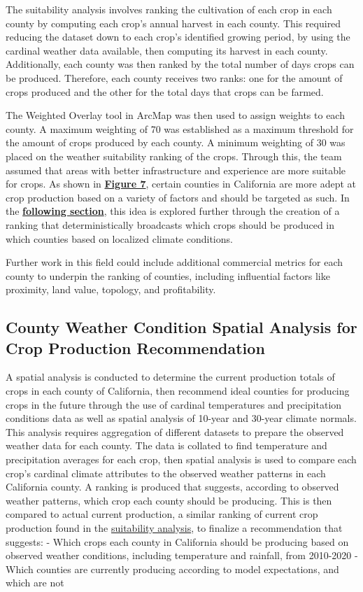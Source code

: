 \documentclass{article}
\begin{document}
\hspace{.5cm}The suitability analysis involves ranking the cultivation of each crop in each county by computing each crop's annual harvest in each county. This required reducing the dataset down to each crop's identified growing period, by using the cardinal weather data available, then computing its harvest in each county. Additionally, each county was then ranked by the total number of days crops can be produced. Therefore, each county receives two ranks: one for the amount of crops produced and the other for the total days that crops can be farmed.

The Weighted Overlay tool in ArcMap was then used to assign weights to each county. A maximum weighting of 70 was established as a maximum threshold for the amount of crops produced by each county. A minimum weighting of 30 was placed on the weather suitability ranking of the crops. Through this, the team assumed that areas with better infrastructure and experience are more suitable for crops. As shown in \textbf{\hyperref[sec:SuitabilityAnalysis]{Figure 7}}, certain counties in California are more adept at crop production based on a variety of factors and should be targeted as such. In the \textbf{\hyperref[sec:spatial]{following section}}, this idea is explored further through the creation of a ranking that deterministically broadcasts which crops should be produced in which counties based on localized climate conditions. 

Further work in this field could include additional commercial metrics for each county to underpin the ranking of counties, including influential factors like proximity, land value, topology, and profitability.

\subsection{County Weather Condition Spatial Analysis for Crop Production Recommendation}
\label{sec:spatial}
\hspace{.5cm}A spatial analysis is conducted to determine the current production totals of crops in each county of California, then recommend ideal counties for producing crops in the future through the use of cardinal temperatures and precipitation conditions data as well as spatial analysis of 10-year and 30-year climate normals. This analysis requires aggregation of different datasets to prepare the observed weather data for each county. The data is collated to find temperature and precipitation averages for each crop, then spatial analysis is used to compare each crop's cardinal climate attributes to the observed weather patterns in each California county. A ranking is produced that suggests, according to observed weather patterns, which crop each county should be producing. This is then compared to actual current production, a similar ranking of current crop production found in the \hyperref[sec:suitability]{suitability analysis}, to finalize a recommendation that suggests:
- Which crops each county in California should be producing based on observed weather conditions, including temperature and rainfall, from 2010-2020
- Which counties are currently producing according to model expectations, and which are not
\end{document}
